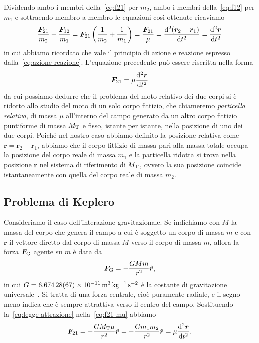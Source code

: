 Dividendo ambo i membri della~\eqref{eq:f21} per $m_2$, ambo i membri
della~\eqref{eq:f12} per $m_1$ e sottraendo membro a membro le equazioni così
ottenute ricaviamo
\begin{equation}
  \frac{\bm{F}_{21}}{m_2}-\frac{\bm{F}_{12}}{m_1} = \bm{F}_{21}
  \left(
    \frac{1}{m_2}+\frac{1}{m_1}
  \right) = \frac{\bm{F}_{21}}{\mu} = \toder[2]{(\bm{r}_2-\bm{r}_1)}{t} =
  \toder[2]{\bm{r}}{t}
\end{equation}
in cui abbiamo ricordato che vale il principio di azione e reazione espresso
dalla~\eqref{eq:azione-reazione}. L'equazione precedente può essere riscritta
nella forma
\begin{equation}
  \label{eq:f21-mu}
  \bm{F}_{21}=\mu\toder[2]{\bm{r}}{t}
\end{equation}
da cui possiamo dedurre che il problema del moto relativo dei due corpi si è
ridotto allo studio del moto di un solo corpo fittizio, che chiameremo
\emph{particella relativa}, di massa $\mu$ all'interno del campo generato da un
altro corpo fittizio puntiforme di massa $M_\textup{T}$ e fisso, istante per
istante, nella posizione di uno dei due corpi. Poiché nel nostro caso abbiamo
definito la posizione relativa come $\bm{r}=\bm{r}_2 - \bm{r}_1$, abbiamo che il
corpo fittizio di massa pari alla massa totale occupa la posizione del corpo
reale di massa $m_1$ e la particella ridotta si trova nella posizione $\bm{r}$
nel sistema di riferimento di $M_\textup{T}$, ovvero la sua posizione coincide
istantaneamente con quella del corpo reale di massa $m_2$.

\subsection{Problema di Keplero}
\label{sec:problema-keplero}

Consideriamo il caso dell'interazione gravitazionale. Se indichiamo con $M$ la
massa del corpo che genera il campo a cui è soggetto un corpo di massa $m$ e con
$\bm{r}$ il vettore diretto dal corpo di massa $M$ verso il corpo di massa $m$,
allora la forza $\bm{F}_\textup{G}$ agente su $m$ è data da
\begin{equation}
  \label{eq:legge-attrazione}
  \bm{F}_\textup{G} = -\frac{GMm}{r^2}\versor{r},
\end{equation}
in cui $G=\SI{6.674
  28(67)e-11}{\metre\tothe{3}\per\kilogram\per\second\squared}$ è la costante di
gravitazione universale~\cite{codata:costanti}. Si tratta di una forza centrale,
cioè puramente radiale, e il segno meno indica che è sempre attrattiva verso il
centro del campo. Sostituendo la~\eqref{eq:legge-attrazione}
nella~\eqref{eq:f21-mu} abbiamo
\begin{equation}
  \label{eq:forza-mu}
  \bm{F}_{21} = -\frac{GM_\textup{T}\mu}{r^2}\versor{r} =
  -\frac{Gm_1m_2}{r^2}\versor{r} = \mu\toder[2]{\bm{r}}{t}.
\end{equation}

